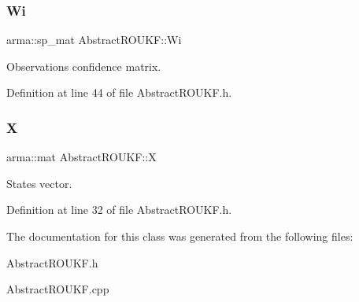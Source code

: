 \subsubsection{\texorpdfstring{Wi}{Wi}}
{\footnotesize\ttfamily arma\+::sp\+\_\+mat Abstract\+R\+O\+U\+K\+F\+::\+Wi\hspace{0.3cm}{\ttfamily [protected]}}

Observations confidence matrix. 

Definition at line 44 of file Abstract\+R\+O\+U\+K\+F.\+h.

\mbox{\label{classAbstractROUKF_afdb4deed00416489ced1729c22a317f2}} 
\subsubsection{\texorpdfstring{X}{X}}
{\footnotesize\ttfamily arma\+::mat Abstract\+R\+O\+U\+K\+F\+::X\hspace{0.3cm}{\ttfamily [protected]}}

States vector. 

Definition at line 32 of file Abstract\+R\+O\+U\+K\+F.\+h.



The documentation for this class was generated from the following files\+:\begin{DoxyCompactItemize}
\item 
Abstract\+R\+O\+U\+K\+F.\+h\item 
Abstract\+R\+O\+U\+K\+F.\+cpp\end{DoxyCompactItemize}
